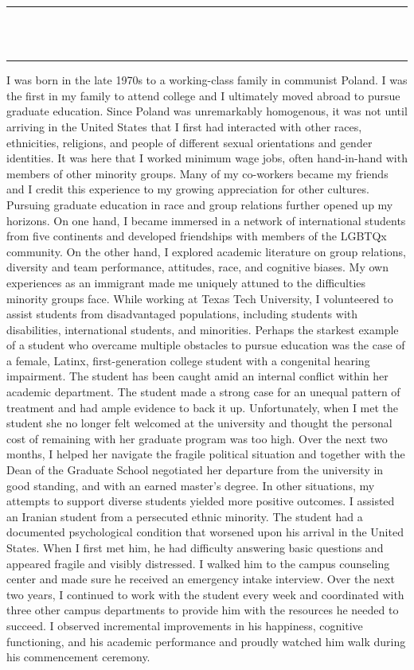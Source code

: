 \documentclass[11pt,letterpaper]{article}
\date{\today}
\makeatletter
\renewcommand{\maketitle}{\thispagestyle{empty}
\vspace*{-45pt}
\begin{center}
{\textgoth{  \fontencoding{T1}\fontfamily{yfrak}\fontsize{75}{0}\bfseries \@papername}}\hfill%
\end{center}
\begin{center}
\vspace*{-5pt}
\rule[0pt]{\textwidth}{0.5pt}\\
\makebox[0pt][l]{\small Ver.\MakeUppercase{\roman{volume}}  Rev.\arabic{issue}}\hfill
 \MakeUppercase{\small\it\@date}\hfill
\makebox[0pt][r]{\small\MakeUppercase{\@paperprice}}\\
\rule[6pt]{\textwidth}{1.2pt}
\end{center}
\pagestyle{plain}
}
\makeatother
\begin{document}
\maketitle

\begin{multicols}{3}

I was born in the late 1970s to a working-class family in communist Poland. I was the first in my family to attend college and I ultimately moved abroad to pursue graduate education. Since Poland was unremarkably homogenous, it was not until arriving in the United States that I first had interacted with other races, ethnicities, religions, and people of different sexual orientations and gender identities. It was here that I worked minimum wage jobs, often hand-in-hand with members of other minority groups. Many of my co-workers became my friends and I credit this experience to my growing appreciation for other cultures. Pursuing graduate education in race and group relations further opened up my horizons. On one hand, I became immersed in a network of international students from five continents and developed friendships with members of the LGBTQx community. On the other hand, I explored academic literature on group relations, diversity and team performance, attitudes, race, and cognitive biases.
My own experiences as an immigrant made me uniquely attuned to the difficulties minority groups face. While working at Texas Tech University, I volunteered to assist students from disadvantaged populations, including students with disabilities, international students, and minorities. Perhaps the starkest example of a student who overcame multiple obstacles to pursue education was the case of a female, Latinx, first-generation college student with a congenital hearing impairment. The student has been caught amid an internal conflict within her academic department. The student made a strong case for an unequal pattern of treatment and had ample evidence to back it up. Unfortunately, when I met the student she no longer felt welcomed at the university and thought the personal cost of remaining with her graduate program was too high. Over the next two months, I helped her navigate the fragile political situation and together with the Dean of the Graduate School negotiated her departure from the university in good standing, and with an earned master's degree.
In other situations, my attempts to support diverse students yielded more positive outcomes. I assisted an Iranian student from a persecuted ethnic minority. The student had a documented psychological condition that worsened upon his arrival in the United States. When I first met him, he had difficulty answering basic questions and appeared fragile and visibly distressed. I walked him to the campus counseling center and made sure he received an emergency intake interview. Over the next two years, I continued to work with the student every week and coordinated with three other campus departments to provide him with the resources he needed to succeed. I observed incremental improvements in his happiness, cognitive functioning, and his academic performance and proudly watched him walk during his commencement ceremony.

\end{multicols}
\end{document}
